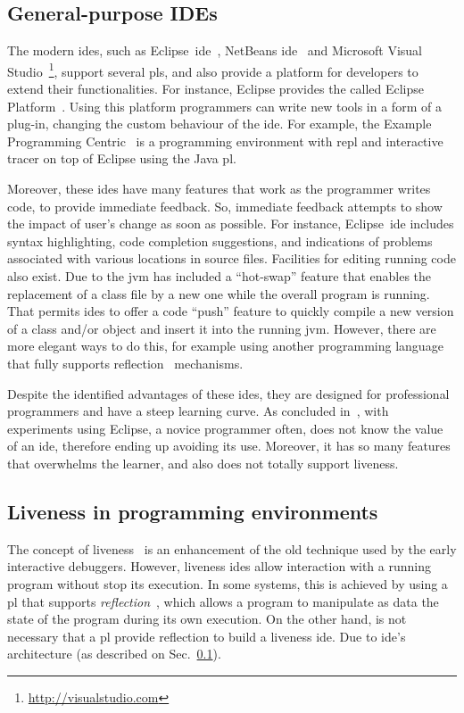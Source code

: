 \subsection{General-purpose IDEs}
\label{sec:ide}

The modern \ac{ide}s, such as Eclipse~\ac{ide}~\cite{carlson2005eclipse}, NetBeans \ac{ide}~\cite{boudreau2002netbeans} and Microsoft Visual Studio~\footnote{\url{http://visualstudio.com}}, support several \ac{pl}s, and also provide a platform for developers to extend their functionalities. For instance, Eclipse provides the called Eclipse Platform~\cite{desrivieres2004eclipse}. Using this platform programmers can write new tools in a form of a plug-in, changing the custom behaviour of the \ac{ide}. For example, the Example Programming Centric~\cite{edwards2004example} is a programming environment with \ac{repl} and interactive tracer on top of Eclipse using the Java \ac{pl}.

Moreover, these \ac{ide}s have many features that work as the programmer writes code, to provide immediate feedback.
So, immediate feedback attempts to show the impact of user's change as soon as possible. For instance, Eclipse~\ac{ide} includes syntax highlighting, code completion suggestions, and indications of problems associated with various locations in source files. Facilities for editing running code also exist. Due to the \ac{jvm} has included a “hot-swap” feature that enables the replacement of a class file by a new one while the overall program is running. That permits \ac{ide}s to offer a code “push” feature to quickly compile a new version of a class and/or object and insert it into the running \ac{jvm}. However, there are more elegant ways to do this, for example using another programming language that fully supports reflection~\cite{bobrow1993clos} mechanisms.

Despite the identified advantages of these \ac{ide}s, they are designed for professional programmers and have a steep learning curve. As concluded in~\cite{Chen:2005:EEI:1089053.1089068}, with experiments using Eclipse, a novice programmer often, does not know the value of an \ac{ide}, therefore ending up avoiding its use. Moreover, it has so many features that overwhelms the learner, and also does not totally support liveness.

\subsection{Liveness in programming environments}
\label{sec:liveness}
The concept of liveness~\cite{tanimoto2013perspective} is an enhancement of the old technique used by the early interactive debuggers. However, liveness \ac{ide}s allow interaction with a running program without stop its execution. In some systems, this is achieved by using a \ac{pl} that supports \textit{reflection}~\cite{bobrow1993clos}, which allows a program to manipulate as data the state of the program during its own execution. On the other hand, is not necessary that a \ac{pl} provide reflection to build a liveness \ac{ide}. Due to \ac{ide}'s architecture (as described on Sec.~\ref{sec:ide}).

